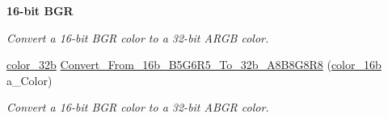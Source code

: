 \begin{Indent}{\bf 16-\/bit BGR}
\begin{DoxyCompactItemize}
\begin{DoxyCompactList}\small\item\em Convert a 16-\/bit BGR color to a 32-\/bit ARGB color. \item\end{DoxyCompactList}\item 
\hyperlink{namespacetil_a8eb2d871b8a6ffb55b3eeb720207a6cb}{color\_\-32b} \hyperlink{namespacetil_aefd9e893058049b916052a7325c827ba}{Convert\_\-From\_\-16b\_\-B5G6R5\_\-To\_\-32b\_\-A8B8G8R8} (\hyperlink{namespacetil_a952afde951048a62d0f970dc6ca89a45}{color\_\-16b} a\_\-Color)
\begin{DoxyCompactList}\small\item\em Convert a 16-\/bit BGR color to a 32-\/bit ABGR color. \item\end{DoxyCompactList}\end{DoxyCompactItemize}
\end{Indent}
